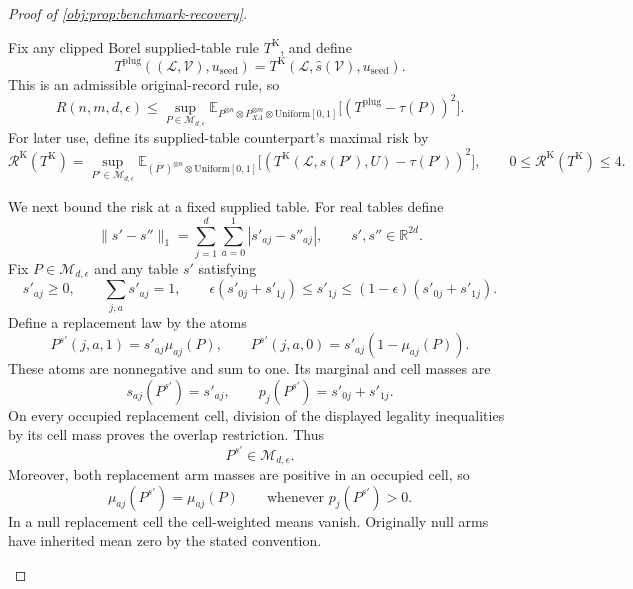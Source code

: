 \documentclass[11pt]{article}
\begin{document}
\begin{proof}[Proof of \cref{obj:prop:benchmark-recovery}]
\begin{enumerate}
Fix any clipped Borel supplied-table rule \(T^{\mathrm K}\), and define
\[
T^{\mathrm{plug}}((\mathcal L,\mathcal V),u_{\mathrm{seed}})
=
T^{\mathrm K}(\mathcal L,\widehat s(\mathcal V),u_{\mathrm{seed}}).
\]
This is an admissible original-record rule, so
\[
R(n,m,d,\epsilon)
\le
\sup_{P\in\mathcal M_{d,\epsilon}}
\mathbb E_{P^{\otimes n}\otimes P_{XA}^{\otimes m}
\otimes\mathrm{Uniform}[0,1]}
\bigl[(T^{\mathrm{plug}}-\tau(P))^2\bigr].
\]
For later use, define its supplied-table counterpart's maximal risk by
\[
\mathscr R^{\mathrm K}(T^{\mathrm K})
=
\sup_{P'\in\mathcal M_{d,\epsilon}}
\mathbb E_{(P')^{\otimes n}\otimes\mathrm{Uniform}[0,1]}
\bigl[
(T^{\mathrm K}(\mathcal L,s(P'),U)-\tau(P'))^2
\bigr],
\qquad
0\le\mathscr R^{\mathrm K}(T^{\mathrm K})\le4.
\]

We next bound the risk at a fixed supplied table. For real tables define
\[
\|s'-s''\|_1=\sum_{j=1}^d\sum_{a=0}^1|s'_{aj}-s''_{aj}|,
\qquad s',s''\in\mathbb R^{2d}.
\]
Fix \(P\in\mathcal M_{d,\epsilon}\) and any table \(s'\) satisfying
\[
s'_{aj}\ge0,\qquad \sum_{j,a}s'_{aj}=1,\qquad
\epsilon(s'_{0j}+s'_{1j})\le s'_{1j}
\le(1-\epsilon)(s'_{0j}+s'_{1j}).
\]
Define a replacement law by the atoms
\[
P^{s'}(j,a,1)=s'_{aj}\mu_{aj}(P),
\qquad
P^{s'}(j,a,0)=s'_{aj}(1-\mu_{aj}(P)).
\]
These atoms are nonnegative and sum to one. Its marginal and cell masses are
\[
s_{aj}(P^{s'})=s'_{aj},
\qquad
p_j(P^{s'})=s'_{0j}+s'_{1j}.
\]
On every occupied replacement cell, division of the displayed legality inequalities by its cell mass proves the overlap restriction. Thus
\[
P^{s'}\in\mathcal M_{d,\epsilon}.
\]
Moreover, both replacement arm masses are positive in an occupied cell, so
\[
\mu_{aj}(P^{s'})=\mu_{aj}(P)
\qquad\text{whenever }p_j(P^{s'})>0.
\]
In a null replacement cell the cell-weighted means vanish. Originally null arms have inherited mean zero by the stated convention.


\end{enumerate}
\end{proof}
\end{document}
